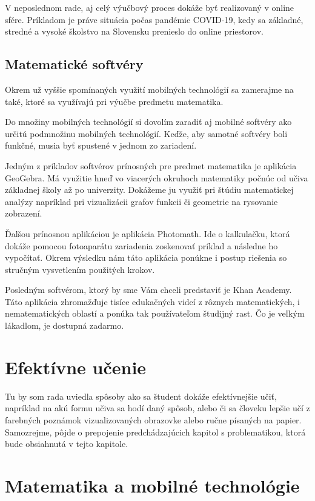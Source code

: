 \documentclass[10pt,twoside,slovak,a4paper]{article}
\begin{document}
V neposlednom rade, aj celý výučbový proces dokáže byť realizovaný v online sfére. Príkladom je práve situácia počas pandémie COVID-19, kedy sa základné, stredné a vysoké školstvo na Slovensku prenieslo do online priestorov.

\subsection{Matematické softvéry} \label{ina:softvery}

Okrem už vyššie spomínaných využití mobilných technológií sa zamerajme na také, ktoré sa využívajú pri výučbe predmetu matematika. 

Do množiny mobilných technológií si dovolím zaradiť aj mobilné softvéry ako určitú podmnožinu mobilných technológií. Keďže, aby samotné softvéry boli funkčné, musia byť spustené v jednom zo zariadení.

Jedným z príkladov softvérov prínosných pre predmet matematika je aplikácia GeoGebra. Má využitie hneď vo viacerých okruhoch matematiky počnúc od učiva základnej školy až po univerzity. Dokážeme ju využiť pri štúdiu matematickej analýzy napríklad pri vizualizácii grafov funkcii či geometrie na rysovanie zobrazení.

Ďalšou prínosnou aplikáciou je aplikácia Photomath. Ide o kalkulačku, ktorá dokáže pomocou fotoaparátu zariadenia zoskenovať príklad a následne ho vypočítať. Okrem výsledku nám táto aplikácia ponúkne i postup riešenia so stručným vysvetlením použitých krokov.

Posledným softvérom, ktorý by sme Vám chceli predstaviť je Khan Academy. Táto aplikácia zhromažďuje tisíce edukačných videí z rôznych matematických, i nematematických oblastí a ponúka tak používateľom študijný rast. Čo je veľkým lákadlom, je dostupná zadarmo.

\section{Efektívne učenie} \label{ucenie}

Tu by som rada uviedla spôsoby ako sa študent dokáže efektívnejšie učiť, napríklad na akú formu učiva sa hodí daný spôsob, alebo či sa človeku lepšie učí z farebných poznámok vizualizovaných obrazovke alebo ručne písaných na papier. Samozrejme, pôjde o prepojenie predchádzajúcich kapitol s problematikou, ktorá bude obsiahnutá v tejto kapitole.



\section{Matematika a mobilné technológie} \label{dolezita}
\end{document}
